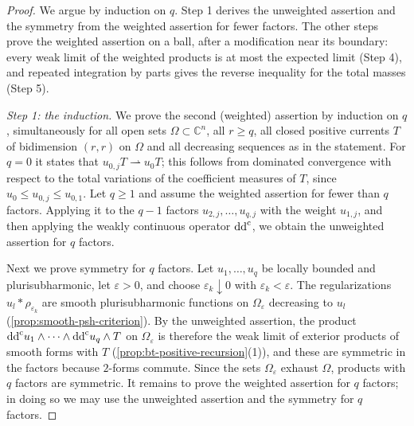 \begin{proof}
We argue by induction on $q$. Step 1 derives the unweighted assertion and the symmetry from the weighted assertion for fewer factors. The other steps prove the weighted assertion on a ball, after a modification near its boundary: every weak limit of the weighted products is at most the expected limit (Step 4), and repeated integration by parts gives the reverse inequality for the total masses (Step 5).

\emph{Step 1: the induction.} We prove the second (weighted) assertion by induction on $q$, simultaneously for all open sets $\Omega\subset\mathbb C^n$, all $r\ge q$, all closed positive currents $T$ of bidimension $(r,r)$ on $\Omega$ and all decreasing sequences as in the statement. For $q=0$ it states that $u_{0,j}T\rightharpoonup u_0T$; this follows from dominated convergence with respect to the total variations of the coefficient measures of $T$, since $u_0\le u_{0,j}\le u_{0,1}$. Let $q\ge1$ and assume the weighted assertion for fewer than $q$ factors. Applying it to the $q-1$ factors $u_{2,j},\ldots,u_{q,j}$ with the weight $u_{1,j}$, and then applying the weakly continuous operator $\mathrm{dd}^{\mathrm{c}}$, we obtain the unweighted assertion for $q$ factors.

Next we prove symmetry for $q$ factors. Let $u_1,\ldots,u_q$ be locally bounded and plurisubharmonic, let $\varepsilon>0$, and choose $\varepsilon_k\downarrow0$ with $\varepsilon_k<\varepsilon$. The regularizations $u_l*\rho_{\varepsilon_k}$ are smooth plurisubharmonic functions on $\Omega_\varepsilon$ decreasing to $u_l$ (\cref{prop:smooth-psh-criterion}). By the unweighted assertion, the product $\mathrm{dd}^{\mathrm{c}} u_1\wedge\cdots\wedge\mathrm{dd}^{\mathrm{c}} u_q\wedge T$ on $\Omega_\varepsilon$ is therefore the weak limit of exterior products of smooth forms with $T$ (\cref{prop:bt-positive-recursion}(1)), and these are symmetric in the factors because $2$-forms commute. Since the sets $\Omega_\varepsilon$ exhaust $\Omega$, products with $q$ factors are symmetric. It remains to prove the weighted assertion for $q$ factors; in doing so we may use the unweighted assertion and the symmetry for $q$ factors.


\end{proof}
